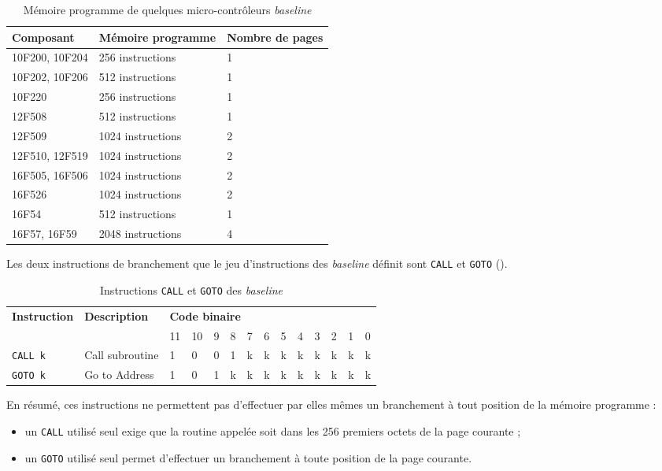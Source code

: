 \begin{table}[!ht]
  \centering
  \small
  \begin{tabular}{lll}
    \textbf{Composant} & \textbf{Mémoire programme} & \textbf{Nombre de pages}\\
    \hline
    10F200, 10F204  & 256 instructions & 1\\
    10F202, 10F206  & 512 instructions & 1\\
    10F220  & 256 instructions & 1\\
    12F508  & 512 instructions & 1\\
    12F509  & 1024 instructions & 2\\
    12F510, 12F519  & 1024 instructions & 2\\
    16F505, 16F506  & 1024 instructions & 2\\
    16F526 & 1024 instructions & 2\\
    16F54  & 512 instructions & 1\\
    16F57, 16F59  & 2048 instructions & 4\\
    \hline
  \end{tabular}
  \caption{Mémoire programme de quelques micro-contrôleurs \emph{baseline}}
\end{table}

Les deux instructions de branchement que le jeu d'instructions des \emph{baseline} définit sont \texttt{CALL} et \texttt{GOTO} ().

\begin{table}[!ht]
  \centering
  \small
  \begin{tabular}{llllllllllllll}
    \textbf{Instruction} & \textbf{Description} & \multicolumn{12}{l}{\bf Code binaire}\\
                         &                      & 11 & 10 & 9 & 8 & 7 & 6 & 5 & 4 & 3 & 2 & 1 & 0\\
    \hline
    \texttt{CALL k}  & Call subroutine & 1 & 0 & 0 & 1 & k & k & k & k & k & k & k & k\\
    \texttt{GOTO k}  & Go to Address   & 1 & 0 & 1 & k & k & k & k & k & k & k & k & k\\
    \hline
  \end{tabular}
  \caption{Instructions \texttt{CALL} et \texttt{GOTO} des \emph{baseline}}
\end{table}

En résumé, ces instructions ne permettent pas d'effectuer par elles mêmes un branchement à tout position de la mémoire programme :
\begin{itemize}
  \item un \texttt{CALL} utilisé seul exige que la routine appelée soit dans les 256 premiers octets de la page courante ;
  \item un \texttt{GOTO} utilisé seul permet d'effectuer un branchement à toute position de la page courante.
\end{itemize}


